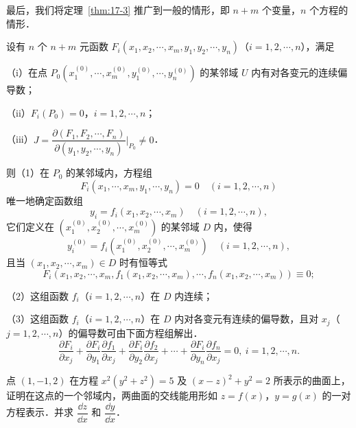 最后，我们将定理~\ref{thm:17-3} 推广到一般的情形，即 $n+m$ 个变量，$n$ 个方程的情形．

\begin{theorem}\label{thm:17-5}
设有 $n$ 个 $n+m$ 元函数 $F_{i}(x_{1},x_{2},\cdots,x_{m},y_{1},y_{2},\cdots,y_{n})$（$i=1,2,\cdots,n$），满足

（i）在点 $P_{0}(x_{1}^{(0)},\cdots,x_{m}^{(0)},y_{1}^{(0)},\cdots,y_{n}^{(0)})$ 的某邻域 $U$ 内有对各变元的连续偏导数；

（ii）$F_{i}(P_{0})=0$，$i=1,2,\cdots,n$；

（iii）$J=\dfrac{\partial(F_{1},F_{2},\cdots,F_{n})}{\partial(y_{1},y_{2},\cdots,y_{n})}\bigg|_{P_{0}}\neq0$．

则（1）在 $P_{0}$ 的某邻域内，方程组
\[
F_{i}(x_{1},\cdots,x_{m},y_{1},\cdots,y_{n})=0\quad(i=1,2,\cdots,n)
\]
唯一地确定函数组
\[
y_{i}=f_{i}(x_{1},x_{2},\cdots,x_{m})\quad(i=1,2,\cdots,n),
\]
它们定义在 $(x_{1}^{(0)},x_{2}^{(0)},\cdots,x_{m}^{(0)})$ 的某邻域 $D$ 内，使得
\[
y_{i}^{(0)}=f_{i}(x_{1}^{(0)},x_{2}^{(0)},\cdots,x_{m}^{(0)})\quad(i=1,2,\cdots,n),
\]
且当 $(x_{1},x_{2},\cdots,x_{m})\in D$ 时有恒等式
\[
F_{i}(x_{1},x_{2},\cdots,x_{m},f_{1}(x_{1},x_{2},\cdots,x_{m}),\cdots,f_{n}(x_{1},x_{2},\cdots,x_{m}))\equiv0;
\]

（2）这组函数 $f_{i}$（$i=1,2,\cdots,n$）在 $D$ 内连续；

（3）这组函数 $f_{i}$（$i=1,2,\cdots,n$）在 $D$ 内对各变元有连续的偏导数，且对 $x_{j}$（$j=1,2,\cdots,n$）的偏导数可由下面方程组解出．
\[
\frac{\partial F_{i}}{\partial x_{j}}+\frac{\partial F_{i}}{\partial y_{1}}\frac{\partial f_{1}}{\partial x_{j}}+\frac{\partial F_{i}}{\partial y_{2}}\frac{\partial f_{2}}{\partial x_{j}}+\cdots+\frac{\partial F_{i}}{\partial y_{n}}\frac{\partial f_{n}}{\partial x_{j}}=0,\ i=1,2,\cdots,n.
\]
\end{theorem}

\begin{example}\label{ex:17-2-3}
点 $(1,-1,2)$ 在方程 $x^{2}(y^{2}+z^{2})=5$ 及 $(x-z)^{2}+y^{2}=2$ 所表示的曲面上，证明在这点的一个邻域内，两曲面的交线能用形如 $z=f(x)$，$y=g(x)$ 的一对方程表示．并求 $\dfrac{\dd z}{\dd x}$ 和 $\dfrac{\dd y}{\dd x}$．
\end{example}

